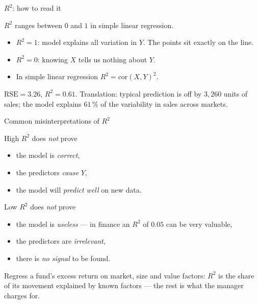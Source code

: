 \documentclass[aspectratio=169,11pt]{beamer}
\begin{document}
\begin{frame}{$R^2$: how to read it}
  \begin{readme}
    $R^2$ ranges between $0$ and $1$ in simple linear regression.
    \begin{itemize}
      \item $R^2 = 1$: model explains all variation in $Y$. The points
            sit exactly on the line.
      \item $R^2 = 0$: knowing $X$ tells us nothing about $Y$.
      \item In simple linear regression $R^2 = \mathrm{cor}(X, Y)^2$.
    \end{itemize}
  \end{readme}
  \begin{numexample}
    $\mathrm{RSE} = 3.26$, $R^2 = 0.61$. Translation: typical
    prediction is off by $3{,}260$ units of sales; the model explains
    $61\,\%$ of the variability in sales across markets.
  \end{numexample}
\end{frame}

\begin{frame}{Common misinterpretations of $R^2$}
  \begin{alertblock}{High $R^2$ does \emph{not} prove}
    \begin{itemize}
      \item the model is \emph{correct},
      \item the predictors \emph{cause} $Y$,
      \item the model will \emph{predict well} on new data.
    \end{itemize}
  \end{alertblock}
  \begin{alertblock}{Low $R^2$ does \emph{not} prove}
    \begin{itemize}
      \item the model is \emph{useless} --- in finance an $R^2$ of $0.05$
            can be very valuable,
      \item the predictors are \emph{irrelevant},
      \item there is \emph{no signal} to be found.
    \end{itemize}
  \end{alertblock}
  \begin{industry}
    Regress a fund's excess return on market, size and value factors: $R^2$
    is the share of its movement explained by known factors --- the rest is
    what the manager charges for.
  \end{industry}
\end{frame}
\end{document}
